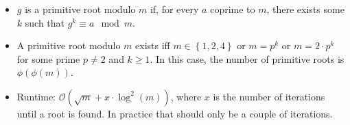\begin{itemize}
	\item $g$ is a primitive root modulo $m$ if, for every $a$ coprime to $m$, there exists some $k$ such that $g^k \equiv a \mod m$.
	\item A primitive root modulo $m$ exists iff $m \in \left\{1, 2, 4\right\}$ or $m = p^k$ or $m = 2 \cdot p^k$ for some prime $p \neq 2$ and $k \geq 1$. In this case, the number of primitive roots is $\phi \left( \phi \left(m\right)\right)$.
	\item Runtime: $\mathcal{O}(\sqrt{m}+x \cdot \log^2(m))$, where $x$ is the number of iterations until a root is found. In practice that should only be a couple of iterations.
\end{itemize}
